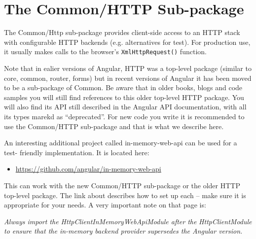 \chapter{The Common/HTTP Sub-package}

The Common/Http sub-package provides client-side access to an HTTP stack with
configurable HTTP backends (e.g. alternatives for test). For production use, it usually
makes calls to the browser’s
\texttt{XmlHttpRequest()}
function.

Note that in ealier versions of Angular, HTTP was a top-level package (similar to core,
common, router, forms) but in recent versions of Angular it has been moved to be a
sub-package of Common. Be aware that in older books, blogs and code samples you
will still find references to this older top-level HTTP package. You will also find its API
still described in the Angular API documentation, with all its types marekd as
“deprecated”. For new code you write it is recommended to use the Common/HTTP
sub-package and that is what we describe here.

An interesting additional project called in-memory-web-api can be used for a test-
friendly implementation. It is located here:

\begin{itemize}
  \item \url{https://github.com/angular/in-memory-web-api}
\end{itemize}

This can work with the new Common/HTTP sub-package or the older HTTP top-level
package. The link about describes how to set up each – make sure it is appropriate for
your needs. A very important note on that page is:

\emph{Always import the HttpClientInMemoryWebApiModule after the}
\emph{HttpClientModule to ensure that the in-memory backend provider}
\emph{supersedes the Angular version.}






